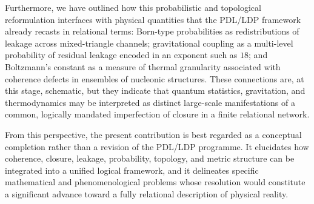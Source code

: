 \documentclass[11pt,a4paper]{article}
\theoremstyle{definition}
\begin{document}
Furthermore, we have outlined how this probabilistic and topological reformulation interfaces with physical quantities that the PDL/LDP framework already recasts in relational terms: Born-type probabilities as redistributions of leakage across mixed-triangle channels; gravitational coupling as a multi-level probability of residual leakage encoded in an exponent such as \(18\); and Boltzmann’s constant as a measure of thermal granularity associated with coherence defects in ensembles of nucleonic structures. These connections are, at this stage, schematic, but they indicate that quantum statistics, gravitation, and thermodynamics may be interpreted as distinct large-scale manifestations of a common, logically mandated imperfection of closure in a finite relational network.

From this perspective, the present contribution is best regarded as a conceptual completion rather than a revision of the PDL/LDP programme. It elucidates how coherence, closure, leakage, probability, topology, and metric structure can be integrated into a unified logical framework, and it delineates specific mathematical and phenomenological problems whose resolution would constitute a significant advance toward a fully relational description of physical reality.
\cite{Laubscher2026_PDL_long}



\end{document}
